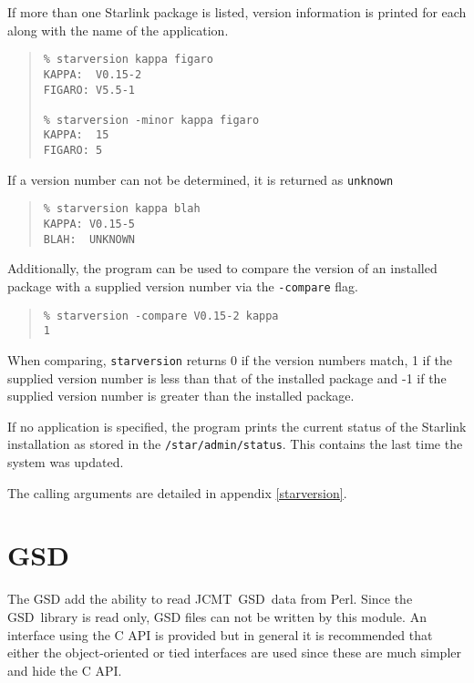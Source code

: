 \documentclass[twoside,11pt]{article}
\newenvironment{myquote}{\begin{quote}\begin{small}}{\end{small}\end{quote}}
\newcommand{\gsd}{\xref{{GSD}}{sun229}{}}
\newcommand{\perl}{\xref{\textsf{Perl}}{sun193}{}}
\newcommand{\jcmt}{\htmladdnormallink{JCMT}{http://www.jach.hawaii.edu/JACpublic/JCMT}}
\newcommand{\htmladdnormallink}[2]{#1}
\newcommand{\xref}[3]{#1}
\renewcommand{\_}{\texttt{\symbol{95}}}
\begin{document}
If more than one Starlink package is listed, version information
is printed for each along with the name of the application.

\begin{myquote}
\begin{verbatim}
% starversion kappa figaro
KAPPA:  V0.15-2
FIGARO: V5.5-1

% starversion -minor kappa figaro
KAPPA:  15
FIGARO: 5
\end{verbatim}
\end{myquote}


If a version number can not be determined, it is returned as \texttt{unknown}

\begin{myquote}
\begin{verbatim}
% starversion kappa blah
KAPPA: V0.15-5
BLAH:  UNKNOWN
\end{verbatim}
\end{myquote}

Additionally, the program can be used to compare the version of 
an installed package with a supplied version number via the
\texttt{-compare} flag.

\begin{myquote}
\begin{verbatim}
% starversion -compare V0.15-2 kappa
1
\end{verbatim}
\end{myquote}

When comparing, \texttt{starversion} returns 0 if the version numbers match,
1 if the supplied version number is less than that of the installed
package and -1 if the supplied version number is greater than the
installed package.



If no application is specified, the program prints the current status
of the Starlink installation as stored in the \texttt{/star/admin/status}.
This contains the last time the system was updated.



The calling arguments are detailed in appendix \ref{starversion}.

\section{GSD}

The GSD add the ability to read \jcmt\ \gsd\ data from \perl. Since the
\gsd\ library is read only, GSD files can not be written by this module.
An interface using the C API is provided but in general it is recommended
that either the object-oriented or tied interfaces are used since these
are much simpler and hide the C API.
\end{document}
